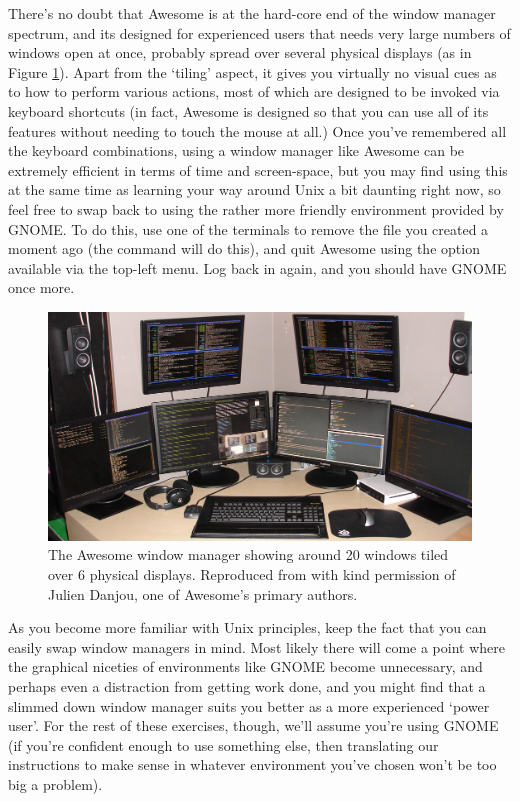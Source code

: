 There's no doubt that Awesome is at the hard-core end of the window manager spectrum, and its designed for experienced users that needs very large numbers of windows open at once, probably spread over several physical displays (as in Figure \ref{figure:awesome}). Apart from the `tiling' aspect, it gives you virtually no visual cues as to how to perform various actions, most of which are designed to be invoked via keyboard shortcuts (in fact, Awesome is designed so that you can use all of its features without needing to touch the mouse at all.) Once you've remembered all the keyboard combinations, using a window manager like Awesome can be extremely efficient in terms of time and screen-space, but you may find using this at the same time as learning your way around Unix a bit daunting right now, so feel free to swap back to using the rather more friendly environment provided by GNOME. To do this, use one of the terminals to remove the  file you created a moment ago (the command  will do this), and quit Awesome using the option available via the top-left menu. Log back in again, and you should have GNOME once more. 

\begin{figure}[htb]
  \begin{center}
    \includegraphics[width=14cm]{images/awesome.png}
  \end{center}
\caption{The Awesome window manager showing around 20 windows tiled over 6 physical displays. Reproduced from  with kind permission of Julien Danjou, one of Awesome's primary authors.}
\label{figure:awesome}
\end{figure}

As you become more familiar with Unix principles, keep the fact that you can easily swap window managers in mind. Most likely there will come a point where the graphical niceties of environments like GNOME become unnecessary, and perhaps even a distraction from getting work done, and you might find that a slimmed down window manager suits you better as a more experienced `power user'. For the rest of these exercises, though, we'll assume you're using GNOME (if you're confident enough to use something else, then translating our instructions to make sense in whatever environment you've chosen won't be too big a problem). 

